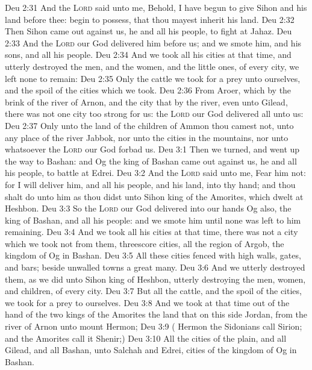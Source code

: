 \vs Deu 2:31 And the \textsc{Lord} said unto me, Behold, I have begun to give Sihon and his land before thee: begin to possess, that thou mayest inherit his land.
\vs Deu 2:32 Then Sihon came out against us, he and all his people, to fight at Jahaz.
\vs Deu 2:33 And the \textsc{Lord} our God delivered him before us; and we smote him, and his sons, and all his people.
\vs Deu 2:34 And we took all his cities at that time, and utterly destroyed the men, and the women, and the little ones, of every city, we left none to remain:
\vs Deu 2:35 Only the cattle we took for a prey unto ourselves, and the spoil of the cities which we took.
\vs Deu 2:36 From Aroer, which  by the brink of the river of Arnon, and  the city that  by the river, even unto Gilead, there was not one city too strong for us: the \textsc{Lord} our God delivered all unto us:
\vs Deu 2:37 Only unto the land of the children of Ammon thou camest not,  unto any place of the river Jabbok, nor unto the cities in the mountains, nor unto whatsoever the \textsc{Lord} our God forbad us.
\vs Deu 3:1 Then we turned, and went up the way to Bashan: and Og the king of Bashan came out against us, he and all his people, to battle at Edrei.
\vs Deu 3:2 And the \textsc{Lord} said unto me, Fear him not: for I will deliver him, and all his people, and his land, into thy hand; and thou shalt do unto him as thou didst unto Sihon king of the Amorites, which dwelt at Heshbon.
\vs Deu 3:3 So the \textsc{Lord} our God delivered into our hands Og also, the king of Bashan, and all his people: and we smote him until none was left to him remaining.
\vs Deu 3:4 And we took all his cities at that time, there was not a city which we took not from them, threescore cities, all the region of Argob, the kingdom of Og in Bashan.
\vs Deu 3:5 All these cities  fenced with high walls, gates, and bars; beside unwalled towns a great many.
\vs Deu 3:6 And we utterly destroyed them, as we did unto Sihon king of Heshbon, utterly destroying the men, women, and children, of every city.
\vs Deu 3:7 But all the cattle, and the spoil of the cities, we took for a prey to ourselves.
\vs Deu 3:8 And we took at that time out of the hand of the two kings of the Amorites the land that  on this side Jordan, from the river of Arnon unto mount Hermon;
\vs Deu 3:9 ( Hermon the Sidonians call Sirion; and the Amorites call it Shenir;)
\vs Deu 3:10 All the cities of the plain, and all Gilead, and all Bashan, unto Salchah and Edrei, cities of the kingdom of Og in Bashan.
